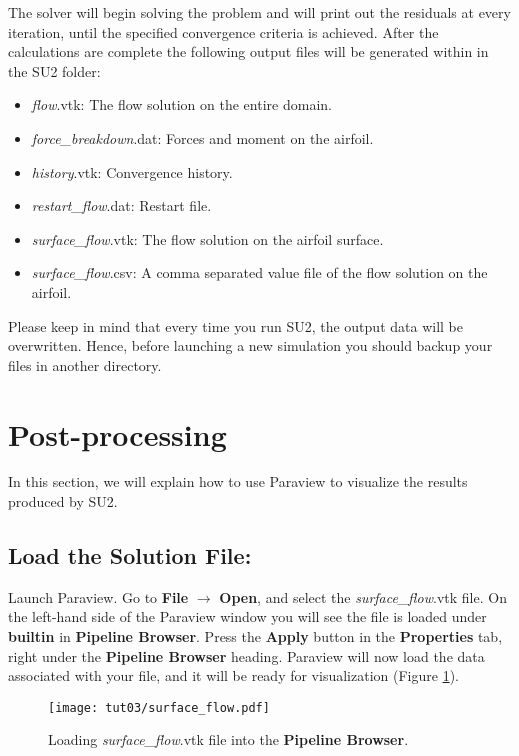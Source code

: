 The solver will begin solving the problem and will print out the residuals at every iteration, until the specified convergence criteria is achieved. After the calculations are complete the following output files will be generated within in the SU2 folder:
\begin{itemize}
    \item \textit{flow}.vtk: The flow solution on the entire domain.
    \item \textit{force\_breakdown}.dat: Forces and moment on the airfoil.
    \item \textit{history}.vtk: Convergence history.
    \item \textit{restart\_flow}.dat: Restart file.
    \item \textit{surface\_flow}.vtk: The flow solution on the airfoil surface.
    \item \textit{surface\_flow}.csv: A comma separated value file of the flow solution on the airfoil.
\end{itemize}
Please keep in mind that every time you run SU2, the output data will be overwritten. Hence, before launching a new simulation you should backup your files in another directory.
\section{Post-processing}
In this section, we will explain how to use Paraview to visualize the results produced by SU2. 
\subsection{Load the Solution File:}
Launch Paraview. Go to \textbf{File} $\rightarrow$ \textbf{Open}, and select the \textit{surface\_flow}.vtk file. On the left-hand side of the Paraview window you will see the file is loaded under \textbf{builtin} in \textbf{Pipeline Browser}. Press the \textbf{Apply} button in the \textbf{Properties} tab, right under the \textbf{Pipeline Browser} heading. Paraview will now load the data associated with your file, and it will be ready for visualization (Figure \ref{fig3:load}).
\begin{figure}[htbp]
    \centering
    \texttt{[image: tut03/surface\_flow.pdf]}
    \caption{Loading \textit{surface\_flow}.vtk file into the \textbf{Pipeline Browser}.}
    \label{fig3:load}
\end{figure}
